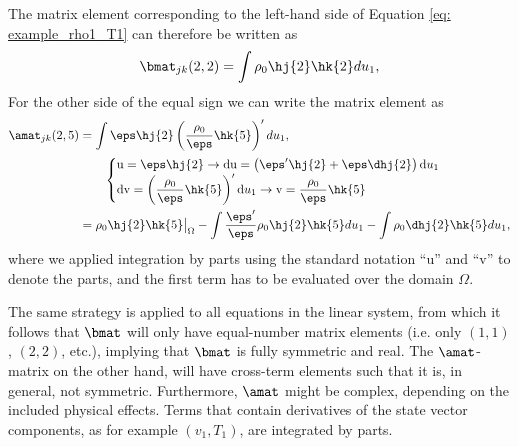 The matrix element corresponding to the left-hand side of Equation \eqref{eq: example_rho1_T1} can therefore be written as
\begin{equation}
  \bmat_{jk}(2, 2) = \int \rho_0 \hj{2}\hk{2}du_1,
\end{equation}
For the other side of the equal sign we can write the matrix element as
\begin{equation} \label{eq: amat_rho1_T1}
  \begin{aligned}
    \amat_{jk}(2, 5) &=
      \int \eps \hj{2}\left(\frac{\rho_0}{\eps}\hk{5}\right)'du_1, \\
      &\qquad \begin{cases}
        \text{u} = \eps\hj{2} \rightarrow \text{du} = \left(\eps'\hj{2} + \eps\dhj{2}\right)\text{d}u_1 \\
        \text{dv} = \left(\dfrac{\rho_0}{\eps}\hk{5}\right)'\text{d}u_1
          \rightarrow \text{v} = \dfrac{\rho_0}{\eps}\hk{5}
      \end{cases} \\
      &= \bigl.\rho_0 \hj{2}\hk{5}\bigr|_\Omega
        - \int \frac{\eps'}{\eps}\rho_0 \hj{2}\hk{5}du_1
        - \int \rho_0 \dhj{2}\hk{5}du_1,
  \end{aligned}
\end{equation}
where we applied integration by parts using the standard notation ``u'' and ``v'' to denote the parts, and the first term has to be evaluated over the domain $\Omega$.

The same strategy is applied to all equations in the linear system, from which it follows that $\bmat$ will only have equal-number matrix elements (i.e. only $(1, 1)$, $(2, 2)$, etc.), implying that $\bmat$ is fully symmetric and real. The $\amat$-matrix on the other hand, will have cross-term elements such that it is, in general, not symmetric. Furthermore, $\amat$ might be complex, depending on the included physical effects. Terms that contain derivatives of the state vector components, as for example $(v_1, T_1)$, are integrated by parts.

